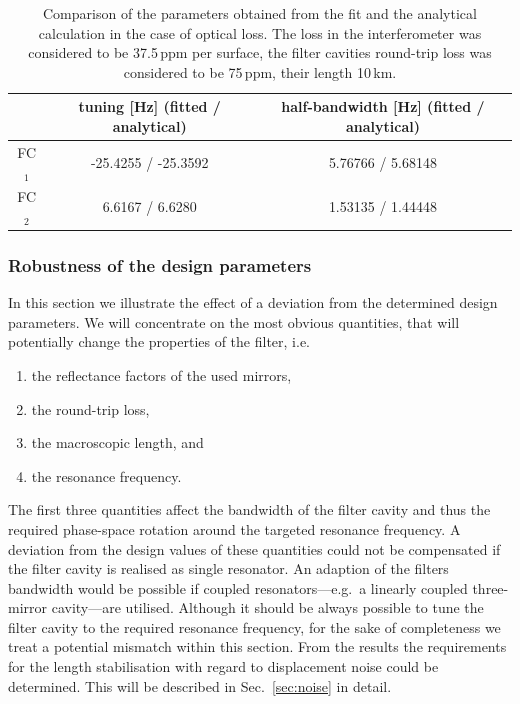 \begin{table}[h]
\centering
\begin{tabular}{c|c|c}
\hline
\hline
 & tuning [Hz]  (fitted / analytical) & half-bandwidth [Hz] (fitted / analytical)\\
\hline
FC$_1$ &-25.4255 / -25.3592  & 5.76766 / 5.68148\\
FC$_2$ & 6.6167 / 6.6280  & 1.53135 / 1.44448  \\
\hline
\hline
\end{tabular}
\caption{Comparison of the parameters obtained from the fit and the analytical calculation in the case of optical loss. The loss in the interferometer was considered to be 37.5\,ppm per surface, the filter cavities round-trip loss was considered to be 75\,ppm, their length 10\,km.}
\label{tab:fitanaparamsloss}
\end{table}
\FloatBarrier
\subsubsection{Robustness of the design parameters}\label{subsec:robustparam}


In this section we illustrate the effect of a deviation from the determined design parameters. We will concentrate on the most obvious quantities, that will potentially  change the properties of the filter, i.e.\

\begin{enumerate}
\item{the reflectance factors of the used mirrors, }
\item{the round-trip loss,}
\item{the macroscopic length, and}
\item{the resonance frequency.}
\end{enumerate}
The first three quantities affect the bandwidth of the filter cavity and thus the required phase-space rotation around the targeted resonance frequency. A deviation from the design values of these quantities could not be compensated if the filter cavity is realised as  single resonator. An adaption of the filters bandwidth would be possible if coupled resonators---e.g.\ a linearly coupled three-mirror cavity---are utilised.  Although it should be always possible to tune the filter cavity to the required resonance frequency, for the sake of completeness we treat a potential  mismatch within this section. From the results the requirements for the length stabilisation with regard to displacement noise could be determined. This will be described in Sec.~\ref{sec:noise} in detail.

